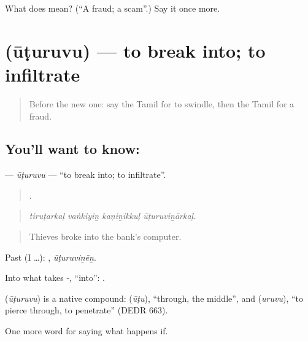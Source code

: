\begin{tcolorbox}[breakable,colback=teal!4,colframe=teal!35!black,title={Before you move on}]
What does  mean? (\textquotedblleft{}A fraud; a scam\textquotedblright{}.) Say it once more.
\end{tcolorbox}
\section[\texorpdfstring{\ta{ஊடுருவு} (ūṭuruvu)}{ஊடுருவு (ūṭuruvu)}]{ (ūṭuruvu) — to break into; to infiltrate}

\label{lesson:TA-C548-uturuvu}



\begin{quote}
Before the new one: say the Tamil for to swindle, then the Tamil for a fraud.
\end{quote}

\subsection*{You'll want to know: }
\textbf{} — \emph{ūṭuruvu} — \textquotedblleft{}to break into; to infiltrate\textquotedblright{}.

\begin{quote}
   .
\end{quote}

\begin{quote}
\emph{tiruṭarkaḷ vaṅkiyiṉ kaṇiṉikkuḷ ūṭuruviṉārkaḷ.}
\end{quote}

\begin{quote}
Thieves broke into the bank's computer.
\end{quote}

Past (I …): , \emph{ūṭuruviṉēṉ}.

Into what takes -, \textquotedblleft{}into\textquotedblright{}:  .

\begin{cousinweb}
\textbf{} (\emph{ūṭuruvu}) is a native compound:  (\emph{ūṭu}), \textquotedblleft{}through, the middle\textquotedblright{}, and  (\emph{uruvu}), \textquotedblleft{}to pierce through, to penetrate\textquotedblright{} (DEDR 663).
\end{cousinweb}

\begin{grammarlens}[title={What you've built}]
One more word for saying what happens if.
\end{grammarlens}

